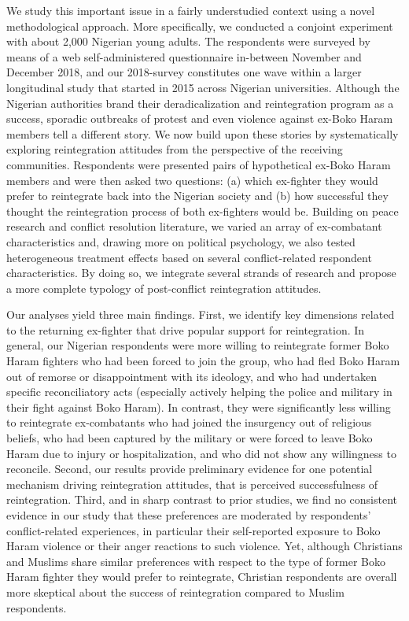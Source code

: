 We study this important issue in a fairly understudied context using a novel methodological approach. More specifically, we conducted a conjoint experiment with about 2,000 Nigerian young adults. The respondents were surveyed by means of a web self-administered questionnaire in-between November and December 2018, and our 2018-survey constitutes one wave within a larger longitudinal study that started in 2015 across Nigerian universities. Although the Nigerian authorities brand their deradicalization and reintegration program as a success, sporadic outbreaks of protest and even violence against ex-Boko Haram members tell a different story. We now build upon these stories by systematically exploring reintegration attitudes from the perspective of the receiving communities. Respondents were presented pairs of hypothetical ex-Boko Haram members and were then asked two questions: (a) which ex-fighter they would prefer to reintegrate back into the Nigerian society and (b) how successful they thought the reintegration process of both ex-fighters would be. Building on peace research and conflict resolution literature, we varied an array of ex-combatant characteristics and, drawing more on political psychology, we also tested heterogeneous treatment effects based on several conflict-related respondent characteristics. By doing so, we integrate several strands of research and propose a more complete typology of post-conflict reintegration attitudes. 


Our analyses yield three main findings. First, we identify key dimensions related to the returning ex-fighter that drive popular support for reintegration. In general, our Nigerian respondents were more willing to reintegrate former Boko Haram fighters who had been forced to join the group, who had fled Boko Haram out of remorse or disappointment with its ideology, and who had undertaken specific reconciliatory acts (especially actively helping the police and military in their fight against Boko Haram). In contrast, they were significantly less willing to reintegrate ex-combatants who had joined the insurgency out of religious beliefs, who had been captured by the military or were forced to leave Boko Haram due to injury or hospitalization, and who did not show any willingness to reconcile. Second, our results provide preliminary evidence for one potential mechanism driving reintegration attitudes, that is perceived successfulness of reintegration. Third, and in sharp contrast to prior studies, we find no consistent evidence in our study that these preferences are moderated by respondents' conflict-related experiences, in particular their self-reported exposure to Boko Haram violence or their anger reactions to such violence. Yet, although Christians and Muslims share similar preferences with respect to the type of former Boko Haram fighter they would prefer to reintegrate, Christian respondents are overall more skeptical about the success of reintegration compared to Muslim respondents.


